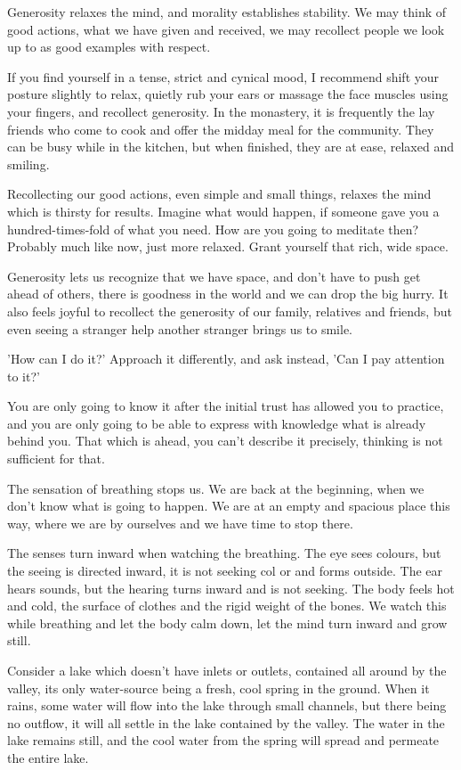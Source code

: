 Generosity relaxes the mind, and morality establishes stability. We may
think of good actions, what we have given and received, we may recollect
people we look up to as good examples with respect.

If you find yourself in a tense, strict and cynical mood, I recommend
shift your posture slightly to relax, quietly rub your ears or massage
the face muscles using your fingers, and recollect generosity. In the
monastery, it is frequently the lay friends who come to cook and offer
the midday meal for the community. They can be busy while in the
kitchen, but when finished, they are at ease, relaxed and smiling.

Recollecting our good actions, even simple and small things, relaxes the
mind which is thirsty for results. Imagine what would happen, if someone
gave you a hundred-times-fold of what you need. How are you going to
meditate then? Probably much like now, just more relaxed. Grant yourself
that rich, wide space.

Generosity lets us recognize that we have space, and don't have to push
get ahead of others, there is goodness in the world and we can drop the
big hurry. It also feels joyful to recollect the generosity of our
family, relatives and friends, but even seeing a stranger help another
stranger brings us to smile.

'How can I do it?' Approach it differently, and ask instead, 'Can I pay
attention to it?'

You are only going to know it after the initial trust has allowed you to
practice, and you are only going to be able to express with knowledge
what is already behind you. That which is ahead, you can't describe it
precisely, thinking is not sufficient for that.

The sensation of breathing stops us. We are back at the beginning, when
we don't know what is going to happen. We are at an empty and spacious
place this way, where we are by ourselves and we have time to stop
there.

The senses turn inward when watching the breathing. The eye sees
colours, but the seeing is directed inward, it is not seeking col or and
forms outside. The ear hears sounds, but the hearing turns inward and is
not seeking. The body feels hot and cold, the surface of clothes and the
rigid weight of the bones. We watch this while breathing and let the
body calm down, let the mind turn inward and grow still.

Consider a lake which doesn't have inlets or outlets, contained all
around by the valley, its only water-source being a fresh, cool spring
in the ground. When it rains, some water will flow into the lake through
small channels, but there being no outflow, it will all settle in the
lake contained by the valley. The water in the lake remains still, and
the cool water from the spring will spread and permeate the entire lake.

